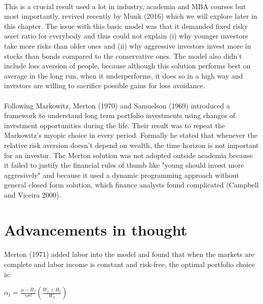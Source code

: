 \paragraph{}This is a crucial result used a lot in industry, academia and MBA courses but most importantly, revived recently by Munk (2016) which we will explore later in this chapter. The issue with this basic model was that it demanded fixed risky asset ratio for everybody and thus could not explain (i) why younger investors take more risks than older ones and (ii) why aggressive investors invest more in stocks than bonds compared to the conservative ones. The model also didn't include loss aversion of people, because although this solution performs best on average in the long run, when it underperforms, it does so in a high way and investors are willing to sacrifice possible gains for loss avoidance.

\paragraph{}Following Markowitz, Merton (1970) and Samuelson (1969) introduced a framework to understand long term portfolio investments using changes of investment opportunities during the life. Their result was to repeat the Markowitz's myopic choice in every period. Formally he stated that whenever the relative risk aversion doesn't depend on wealth, the time horizon is not important for an investor. The Merton solution was not adopted outside academia because it failed to justify the financial rules of thumb like "young should invest more aggresively" and because it used a dynamic programming approach without general closed form solution, which finance analysts found complicated (Campbell and Viceira 2000).



\section{Advancements in thought}

\paragraph*{}Merton (1971) added labor into the model and found that when the markets are complete and labor income is constant and risk-free, the optimal portfolio choice is:

\begin{center}
	$\alpha_t = \frac{\mu - R_f}{\gamma \sigma^2}(\frac{W_t + H_t}{W_t})$
\end{center}

